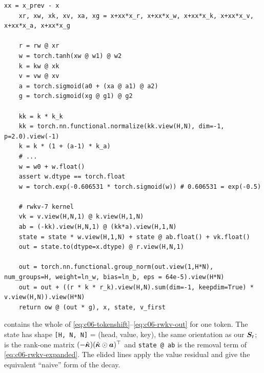 \begin{lstlisting}[caption={Excerpt from \texttt{repos/\allowbreak{}BlinkDL\_\_RWKV-LM/\allowbreak{}RWKV-v7/\allowbreak{}rwkv\_v7\_demo\_rnn.py} (time mixing in RNN mode)},label={lst:c06-rwkv-rnn}]
    xx = x_prev - x
    xr, xw, xk, xv, xa, xg = x+xx*x_r, x+xx*x_w, x+xx*x_k, x+xx*x_v, x+xx*x_a, x+xx*x_g

    r = rw @ xr
    w = torch.tanh(xw @ w1) @ w2
    k = kw @ xk
    v = vw @ xv
    a = torch.sigmoid(a0 + (xa @ a1) @ a2)
    g = torch.sigmoid(xg @ g1) @ g2

    kk = k * k_k
    kk = torch.nn.functional.normalize(kk.view(H,N), dim=-1, p=2.0).view(-1)
    k = k * (1 + (a-1) * k_a)
    # ...
    w = w0 + w.float()
    assert w.dtype == torch.float
    w = torch.exp(-0.606531 * torch.sigmoid(w)) # 0.606531 = exp(-0.5)
    
    # rwkv-7 kernel
    vk = v.view(H,N,1) @ k.view(H,1,N)
    ab = (-kk).view(H,N,1) @ (kk*a).view(H,1,N)
    state = state * w.view(H,1,N) + state @ ab.float() + vk.float()
    out = state.to(dtype=x.dtype) @ r.view(H,N,1)

    out = torch.nn.functional.group_norm(out.view(1,H*N), num_groups=H, weight=ln_w, bias=ln_b, eps = 64e-5).view(H*N)    
    out = out + ((r * k * r_k).view(H,N).sum(dim=-1, keepdim=True) * v.view(H,N)).view(H*N)
    return ow @ (out * g), x, state, v_first
\end{lstlisting}

 contains the whole of
\eqref{eq:c06-tokenshift}--\eqref{eq:c06-rwkv-out} for one token. The state has shape \texttt{[H, N, N]} = (head, value, key), the same orientation as
our $\bm{S}_t$;  is the rank-one matrix $(-\hat{\bm\kappa})(\hat{\bm\kappa}\odot\bm{a})^{\top}$
and \texttt{state @ ab} is the removal term of \eqref{eq:c06-rwkv-expanded}. The elided lines
apply the value residual and give the equivalent ``naive'' form of the decay.

